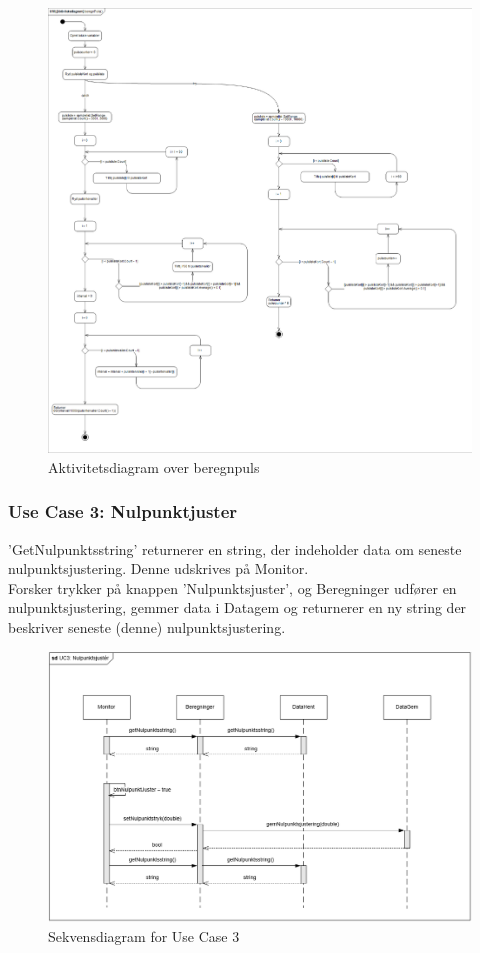 \begin{figure}[H]
	\centering
	\includegraphics[width=1\textwidth]{Figurer/aktivitetsdiagram_beregnPuls}
	\caption{Aktivitetsdiagram over beregnpuls}
\end{figure}


\subsubsection{Use Case 3: Nulpunktjuster}
'GetNulpunktsstring' returnerer en string, der indeholder data om seneste nulpunktsjustering. Denne udskrives på Monitor.\\
Forsker trykker på knappen 'Nulpunktsjuster', og Beregninger udfører en nulpunktsjustering, gemmer data i Datagem og returnerer en ny string der beskriver seneste (denne) nulpunktsjustering.

\begin{figure}[H]
	\centering
	\includegraphics[width=1\textwidth]{Figurer/UC3_SD_SW}
	\caption{Sekvensdiagram for Use Case 3}
\end{figure}

